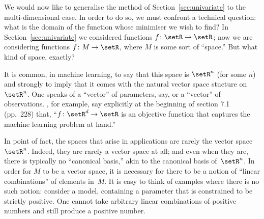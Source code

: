 \documentclass[10pt, a4paper]{article}
\begin{document}

We would now like to generalise the method of
Section~\ref{sec:univariate} to the multi-dimensional case. In order
to do so, we must confront a technical question: what is the domain of
the function whose minimiser we wish to find? In
Section~\ref{sec:univariate} we considered functions
$f\colon\setR\to\setR$; now we are considering functions
$f\colon M\to \setR$, where $M$ is some sort of “space.” But what kind
of space, exactly?

It is common, in machine learning, to say that this space is $\setR^n$
(for some $n$) and strongly to imply that it comes with the natural
vector space stucture on~$\setR^n$. One speaks of a ``vector'' of
parameters, say, or a ``vector'' of observations. \textcite{deisenroth2020mathematics}, for example, say
explicitly at the beginning of section 7.1 (pp.~228) that,
``$f\colon\setR^d\to\setR$ is an objective function that captures the
machine learning problem at hand.''

In point of fact, the spaces that arise in applications are rarely the
vector space $\setR^n$. Indeed, they are rarely a vector space at all;
and even when they are, there is typically no ``canonical basis,''
akin to the canonical basis of~$\setR^n$. In order for $M$ to be a
vector space, it is necessary for there to be a notion of ``linear
combinations'' of elements in~$M$. It is easy to think of examples
where there is no such notion: consider a model, containing a
parameter that is constrained to be strictly positive. One cannot take
arbitrary linear combinations of positive numbers and still produce a
positive number.
\end{document}
